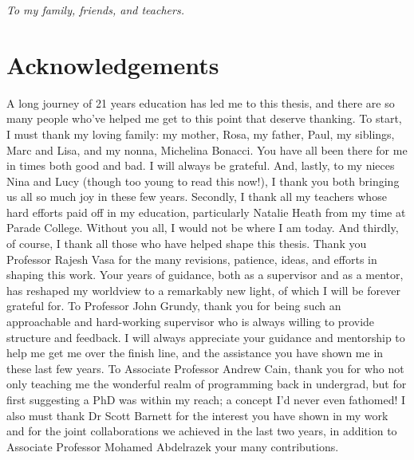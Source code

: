 \thispagestyle{empty}
\begin{center}
  \vspace*{0.3\paperheight}
  \textit{To my family, friends, and teachers.}
\end{center}

\cleardoubleevenemptypage
{}
{}
\chapter*{Acknowledgements}

\vspace{-6\bigskipamount}

A long journey of 21 years education has led me to this thesis, and there are so many people who've helped me get to this point that deserve thanking. 
To start, I must thank my loving family: my mother, Rosa, my father, Paul, my siblings, Marc and Lisa, and my nonna, Michelina Bonacci. You have all been there for me in times both good and bad. I will always be grateful. And, lastly, to my nieces Nina and Lucy (though too young to read this now!), I thank you both bringing us all so much joy in these few years.
Secondly, I thank all my teachers whose hard efforts paid off in my education, particularly Natalie Heath from my time at Parade College. Without you all, I would not be where I am today.
And thirdly, of course, I thank all those who have helped shape this thesis. Thank you Professor Rajesh Vasa for the many revisions, patience, ideas, and efforts in shaping this work. Your years of guidance, both as a supervisor and as a mentor, has reshaped my worldview to a remarkably new light, of which I will be forever grateful for. 
To Professor John Grundy, thank you for being such an approachable and hard-working supervisor who is always willing to provide structure and feedback. I will always appreciate your guidance and mentorship to help me get me over the finish line, and the assistance you have shown me in these last few years.
To Associate Professor Andrew Cain, thank you for who not only teaching me the wonderful realm of programming back in undergrad, but for first suggesting a PhD was within my reach; a concept I'd never even fathomed!
I also must thank Dr Scott Barnett for the interest you have shown in my work and for the joint collaborations we achieved in the last two years, in addition to Associate Professor Mohamed Abdelrazek your many contributions. 
